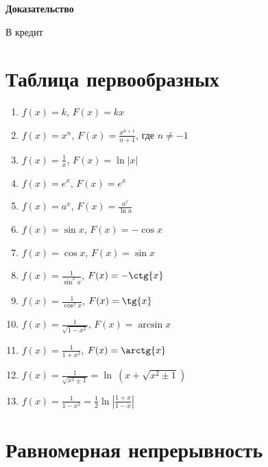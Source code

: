 \documentclass{article}
\begin{document}
		\textbf{Доказательство}
			
		В кредит
			
	\newpage
		
	\section{Таблица первообразных}
		
		\begin{enumerate}
			
			\item $f(x) = k$, $F(x) = kx$
				
			\item $f(x) = x^n$, $F(x) = \frac{x^{n + 1}}{n + 1}$, где $n \neq -1$
				
			\item $f(x) = \frac{1}{x}$, $F(x) = \ln |x|$
				
			\item $f(x) = e^x$, $F(x) = e^x$
				
			\item $f(x) = a^x$, $F(x) = \frac{a^x}{\ln a}$
				
			\item $f(x) = \sin{x}$, $F(x) = -\cos{x}$
				
			\item $f(x) = \cos{x}$, $F(x) = \sin{x}$
				
			\item $f(x) = \frac{1}{\sin^2{x}}$, $F(x) = -\ctg{x}$
				
			\item $f(x) = \frac{1}{\cos^2{x}}$, $F(x) = \tg{x}$
				
			\item $f(x) = \frac{1}{\sqrt{1 - x^2}}$, $F(x) = \arcsin{x}$
				
			\item $f(x) = \frac{1}{1 + x^2}$, $F(x) = \arctg{x}$
			
			\item $f(x) = \frac{1}{\sqrt{x^2 \pm 1}} = \ln~(x + \sqrt{x^2 \pm 1})$
			
			\item $f(x) = \frac{1}{1 - x^2} = \frac{1}{2} \ln{\left| \frac{1+x}{1-x} \right|}$
				
		\end{enumerate}
			
	\newpage
		
	\section{Равномерная непрерывность}
		
\end{document}

